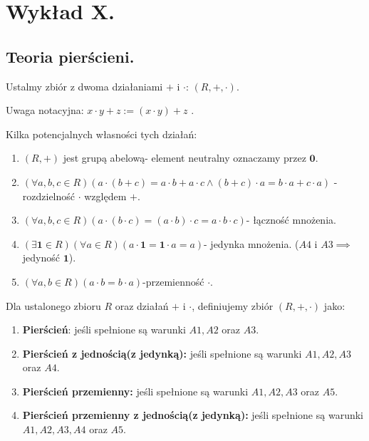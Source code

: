 \chapter{Wykład X.}


\section{Teoria pierścieni.}

Ustalmy zbiór z dwoma działaniami $+$ i $\cdot $: $\left( R, +,  \cdot  \right) $.

Uwaga notacyjna: $x\cdot y + z := \left( x\cdot y \right) + z$ .

Kilka potencjalnych własności tych działań:
\begin{enumerate}[label=A\arabic*.]
	\item $\left( R, + \right) $ jest grupą abelową- element neutralny oznaczamy przez $\mathbf{0}$.
	\item $\left(\forall a,b,c \in R \right)\left( a\cdot \left( b+c \right) = a\cdot b + a\cdot c \land (b+c)\cdot a = b\cdot a + c\cdot a\right) $ -rozdzielność $\cdot $ względem $+$.
	\item $\left(\forall a,b,c\in R \right) \left( a\cdot \left( b\cdot c \right) = \left( a\cdot b \right) \cdot c = a\cdot b\cdot c \right) $- łączność mnożenia.
	\item $\left(\exists \mathbf{1}\in R \right)\left(\forall a\in R \right)\left( a\cdot \mathbf{1} = \mathbf{1}\cdot a = a\right)$- jedynka mnożenia.  ($A4 \text{ i } A3 \implies $ jedyność $\mathbf{1}$).
	\item $\left(\forall a,b\in R \right)\left( a\cdot b = b\cdot a\right)  $-przemienność $\cdot $.
\end{enumerate}
\begin{definition}[Pierścień]
	Dla ustalonego zbioru $R$ oraz działań $+$ i $\cdot $, definiujemy zbiór $\left( R, +, \cdot  \right) $ jako:
	\begin{enumerate}[label=\arabic*.]
		\item \textbf{Pierścień}: jeśli spełnione są warunki $A1, A2$ oraz $A3$.
		\item  \textbf{Pierścień z jednością(z jedynką):} jeśli spełnione są warunki $A1, A2, A3$ oraz $A4$.
		\item \textbf{Pierścień przemienny:} jeśli spełnione są warunki $A1, A2, A3$ oraz $A5$.
		\item \textbf{Pierścień przemienny z jednością(z jedynką):} jeśli spełnione są warunki $A1, A2, A3, A4$ oraz $A5$.
	\end{enumerate}
\end{definition} 

